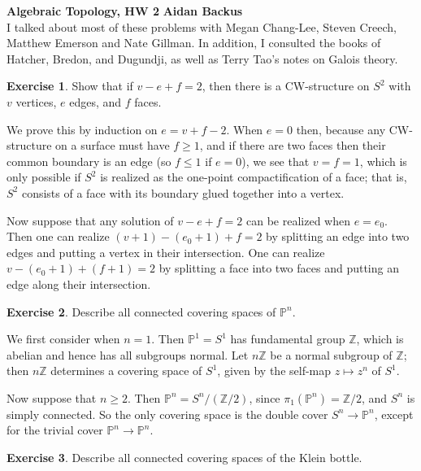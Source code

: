 \documentclass[10pt]{article}
\newcommand{\ZZ}{\mathbb{Z}}
\newcommand{\PP}{\mathbb P}
\theoremstyle{definition}
\newtheorem{exer}{Exercise}
\begin{document}
\noindent
\large\textbf{Algebraic Topology, HW 2} \hfill \textbf{Aidan Backus} \\

I talked about most of these problems with Megan Chang-Lee, Steven Creech, Matthew Emerson and Nate Gillman.
In addition, I consulted the books of Hatcher, Bredon, and Dugundji, as well as Terry Tao's notes on Galois theory.

\begin{exer}
Show that if $v - e + f = 2$, then there is a CW-structure on $S^2$ with $v$ vertices, $e$ edges, and $f$ faces.
\end{exer}

We prove this by induction on $e = v + f - 2$. When $e = 0$ then, because any CW-structure on a surface must have $f \geq 1$, and if there are two faces then their common boundary is an edge (so $f \leq 1$ if $e = 0$), we see that $v = f = 1$, which is only possible if $S^2$ is realized as the one-point compactification of a face; that is, $S^2$ consists of a face with its boundary glued together into a vertex.

Now suppose that any solution of $v - e + f = 2$ can be realized when $e = e_0$.
Then one can realize $(v + 1) - (e_0 + 1) + f = 2$ by splitting an edge into two edges and putting a vertex in their intersection.
One can realize $v - (e_0 + 1) + (f + 1) = 2$ by splitting a face into two faces and putting an edge along their intersection.

\begin{exer}
Describe all connected covering spaces of $\PP^n$.
\end{exer}

We first consider when $n = 1$. Then $\PP^1 = S^1$ has fundamental group $\ZZ$, which is abelian and hence has all subgroups normal.
Let $n\ZZ$ be a normal subgroup of $\ZZ$; then $n\ZZ$ determines a covering space of $S^1$, given by the self-map $z \mapsto z^n$ of $S^1$.

Now suppose that $n \geq 2$. Then $\PP^n = S^n/(\ZZ/2)$, since $\pi_1(\PP^n) = \ZZ/2$, and $S^n$ is simply connected.
So the only covering space is the double cover $S^n \to \PP^n$, except for the trivial cover $\PP^n \to \PP^n$.

\begin{exer}
Describe all connected covering spaces of the Klein bottle.
\end{exer}
\end{document}
